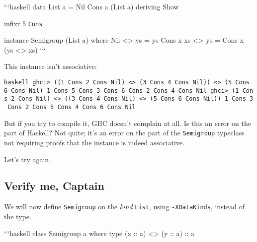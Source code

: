 \documentclass[]{article}
\begin{document}
```haskell data List a = Nil \textbar{} Cons a (List a) deriving Show

infixr 5 \texttt{Cons}

instance Semigroup (List a) where Nil \textless{}\textgreater{} ys = ys Cons x
xs \textless{}\textgreater{} ys = Cons x (ys \textless{}\textgreater{} xs) ```

This instance isn't associative:

\texttt{haskell\ ghci\textgreater{}\ ((1\ \textasciigrave{}Cons\textasciigrave{}\ 2\ \textasciigrave{}Cons\textasciigrave{}\ Nil)\ \textless{}\textgreater{}\ (3\ \textasciigrave{}Cons\textasciigrave{}\ 4\ \textasciigrave{}Cons\textasciigrave{}\ Nil))\ \textless{}\textgreater{}\ (5\ \textasciigrave{}Cons\textasciigrave{}\ 6\ \textasciigrave{}Cons\textasciigrave{}\ Nil)\ 1\ \textasciigrave{}Cons\textasciigrave{}\ 5\ \textasciigrave{}Cons\textasciigrave{}\ 3\ \textasciigrave{}Cons\textasciigrave{}\ 6\ \textasciigrave{}Cons\textasciigrave{}\ 2\ \textasciigrave{}Cons\textasciigrave{}\ 4\ \textasciigrave{}Cons\textasciigrave{}\ Nil\ ghci\textgreater{}\ (1\ \textasciigrave{}Cons\textasciigrave{}\ 2\ \textasciigrave{}Cons\textasciigrave{}\ Nil)\ \textless{}\textgreater{}\ ((3\ \textasciigrave{}Cons\textasciigrave{}\ 4\ \textasciigrave{}Cons\textasciigrave{}\ Nil)\ \textless{}\textgreater{}\ (5\ \textasciigrave{}Cons\textasciigrave{}\ 6\ \textasciigrave{}Cons\textasciigrave{}\ Nil))\ 1\ \textasciigrave{}Cons\textasciigrave{}\ 3\ \textasciigrave{}Cons\textasciigrave{}\ 2\ \textasciigrave{}Cons\textasciigrave{}\ 5\ \textasciigrave{}Cons\textasciigrave{}\ 4\ \textasciigrave{}Cons\textasciigrave{}\ 6\ \textasciigrave{}Cons\textasciigrave{}\ Nil}

But if you try to compile it, GHC doesn't complain at all. Is this an error on
the part of Haskell? Not quite; it's an error on the part of the
\texttt{Semigroup} typeclass not requiring proofs that the instance is indeed
associative.

Let's try again.

\subsection{Verify me, Captain}

We will now define \texttt{Semigroup} on the \emph{kind} \texttt{List}, using
\texttt{-XDataKinds}, instead of the type.

```haskell class Semigroup a where type (x :: a) \textless{}\textgreater{} (y ::
a) :: a
\end{document}
